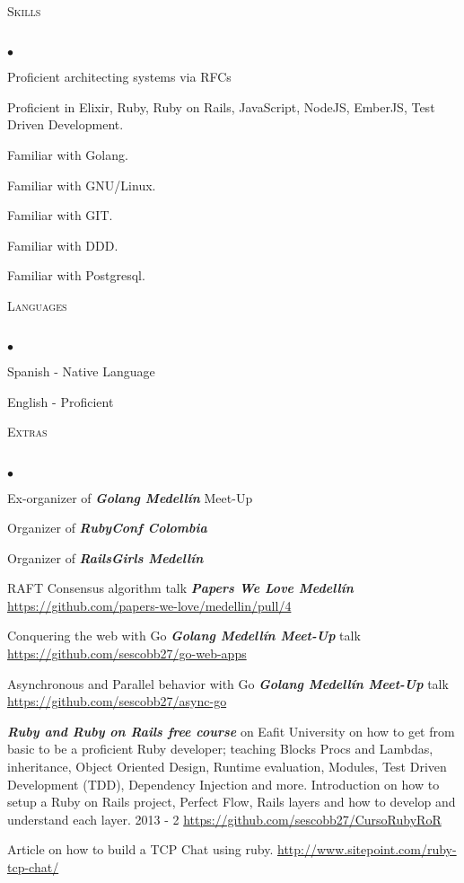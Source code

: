 \documentclass[a4paper]{article}
\newcommand{\lineunder}{\vspace*{-8pt} \\ \hspace*{-18pt} \hrulefill \\}
\newcommand{\header}[1]{{\hspace*{-15pt}\vspace*{6pt}
\textsc{#1}} \vspace*{-6pt} \lineunder}
\newenvironment{achievements}{\begin{list}{$\bullet$}{\topsep 0pt \itemsep
-2pt}}{\vspace*{4pt}\end{list}}
\newcommand{\emphasys}[1]{\textbf{\emph{#1}}}
\begin{document}
\header{Skills}
\begin{achievements}
\item {Proficient architecting systems via RFCs}
\item {Proficient in Elixir, Ruby, Ruby on Rails, JavaScript, NodeJS, EmberJS, Test Driven Development.}
\item {Familiar with Golang.}
\item {Familiar with GNU/Linux.}
\item {Familiar with GIT.}
\item {Familiar with DDD.}
\item {Familiar with Postgresql.}
\end{achievements}
\header{Languages}
\begin{achievements}
\item{Spanish - Native Language}
\item{English - Proficient}
\end{achievements}

\header{Extras}
\begin{achievements}
\item{Ex-organizer of \emphasys{Golang Medell\'in} Meet-Up}
\item{Organizer of \emphasys{RubyConf Colombia}}
\item{Organizer of \emphasys{RailsGirls Medell\'in}}
\item{RAFT Consensus algorithm talk \emphasys{Papers We Love Medell\'in} \url{https://github.com/papers-we-love/medellin/pull/4}}
\item{Conquering the web with Go \emphasys{Golang Medell\'in Meet-Up} talk \url{https://github.com/sescobb27/go-web-apps}}
\item{Asynchronous and Parallel behavior with Go \emphasys{Golang Medell\'in Meet-Up} talk \url{https://github.com/sescobb27/async-go}}
\item{\emphasys{Ruby and Ruby on Rails free course} on Eafit University on how to get from basic to be a proficient Ruby developer; teaching Blocks Procs and Lambdas, inheritance, Object Oriented Design, Runtime evaluation, Modules, Test Driven Development (TDD), Dependency Injection and more. Introduction on how to setup a Ruby on Rails project, Perfect Flow, Rails layers and how to develop and understand each layer. 2013 - 2 \url{https://github.com/sescobb27/CursoRubyRoR}}
\item{Article on how to build a TCP Chat using ruby. \url{http://www.sitepoint.com/ruby-tcp-chat/}}
\end{achievements}
\end{document}
